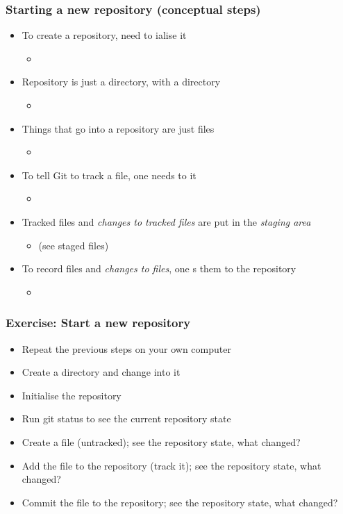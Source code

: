 \documentclass{git_course}
\begin{document}
\begin{frame}
\frametitle{Starting a new repository (conceptual steps)}
\begin{itemize}
    \item To create a repository, need to ialise it
        \begin{itemize}
            \item {}
        \end{itemize}
    \item Repository is just a directory, with a  directory
        \begin{itemize}
            \item {}
        \end{itemize}
    \item Things that go into a repository are just files
        \begin{itemize}
            \item {}
        \end{itemize}
    \item To tell Git to track a file, one needs to  it
        \begin{itemize}
            \item {}
        \end{itemize}
    \item Tracked files and \emph{changes to tracked files} are put in
        the \emph{staging area}
        \begin{itemize}
            \item {} (see staged files)
        \end{itemize}
    \item To record files and \emph{changes to files}, one s
        them to the repository
        \begin{itemize}
            \item {}
        \end{itemize}
\end{itemize}
\end{frame}

\begin{frame}
\frametitle{Exercise: Start a new repository}
\begin{itemize}
    \item Repeat the previous steps on your own computer
    \item Create a directory and change into it
    \item Initialise the repository
    \item Run git status to see the current repository state
    \item Create a file (untracked); see the repository state, what changed?
    \item Add the file to the repository (track it); see the repository
        state, what changed?
    \item Commit the file to the repository; see the repository state, what
        changed?
\end{itemize}
\end{frame}
\end{document}
